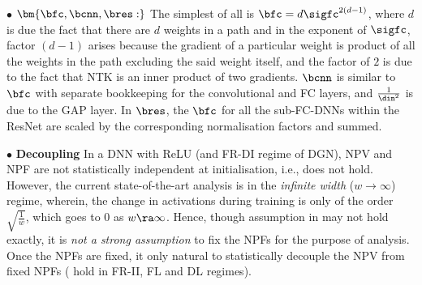 $\bullet$ $\bm{\bfc,\bcnn,\bres:}$ The simplest of all is $\bfc=d\sigfc^{2(d-1)}$, where $d$ is  due the fact that there are $d$ weights in a path and in the exponent of $\sigfc$, factor $(d-1)$ arises because the gradient of a particular weight is product of all the weights in the path excluding the said weight itself, and the factor of $2$ is due to the fact that NTK is an inner product of two gradients. $\bcnn$ is similar to $\bfc$ with separate bookkeeping for the convolutional and FC layers, and $\frac{1}{\din^2}$ is due to the GAP layer. In $\bres$, the $\bfc$ for all the sub-FC-DNNs within the ResNet are scaled by the corresponding normalisation factors and summed.

$\bullet$ \textbf{Decoupling} In a DNN with ReLU (and FR-DI regime of DGN), NPV and NPF are not statistically independent at initialisation, i.e.,  does not hold. However, the current state-of-the-art analysis \cite{ntk,arora2019exact,cao2019generalization} is in the \emph{infinite width} ($w\rightarrow\infty$) regime, wherein, the change in activations during training is  only of the order $\sqrt{\frac{1}{w}}$, which goes to $0$ as $w\ra\infty$. Hence, though assumption in  may not hold exactly, it is \emph{not a strong assumption} to fix the NPFs for the purpose of analysis. Once the NPFs are fixed, it only natural to statistically decouple the NPV from fixed NPFs ( hold in FR-II, FL and DL regimes).  %

